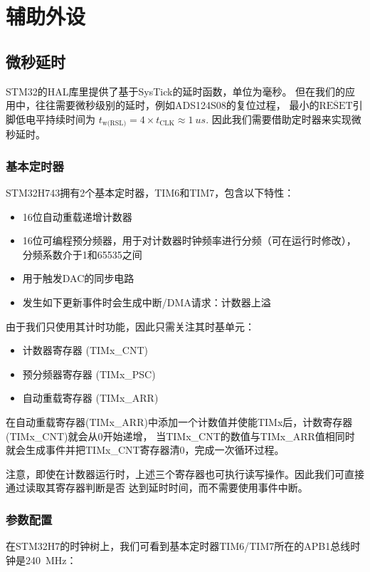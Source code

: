 \section{辅助外设}
\subsection{微秒延时}
STM32的HAL库里提供了基于SysTick的延时函数，单位为毫秒。
但在我们的应用中，往往需要微秒级别的延时，例如ADS124S08的复位过程，
最小的$\overline{\text{RESET}}$引脚低电平持续时间为
$t_\textrm{w(RSL)} = 4\times t_\textrm{CLK}\approx\SI{1}{us}$.
因此我们需要借助定时器来实现微秒延时。

\subsubsection{基本定时器}
STM32H743拥有2个基本定时器，TIM6和TIM7，包含以下特性：

\begin{itemize}
    \item 16位自动重载递增计数器
    \item 16位可编程预分频器，用于对计数器时钟频率进行分频（可在运行时修改），
    分频系数介于1和65535之间
    \item 用于触发DAC的同步电路
    \item 发生如下更新事件时会生成中断/DMA请求：计数器上溢
\end{itemize}

由于我们只使用其计时功能，因此只需关注其时基单元：

\begin{itemize}
    \item 计数器寄存器 (TIMx\_CNT)
    \item 预分频器寄存器 (TIMx\_PSC)
    \item 自动重载寄存器 (TIMx\_ARR)
\end{itemize}

在自动重载寄存器(TIMx\_ARR)中添加一个计数值并使能TIMx后，计数寄存器(TIMx\_CNT)就会从0开始递增，
当TIMx\_CNT的数值与TIMx\_ARR值相同时就会生成事件并把TIMx\_CNT寄存器清0，完成一次循环过程。

注意，即使在计数器运行时，上述三个寄存器也可执行读写操作。因此我们可直接通过读取其寄存器判断是否
达到延时时间，而不需要使用事件中断。

\subsubsection{参数配置}
在STM32H7的时钟树上，我们可看到基本定时器TIM6/TIM7所在的APB1总线时钟是\SI{240}{MHz}：

